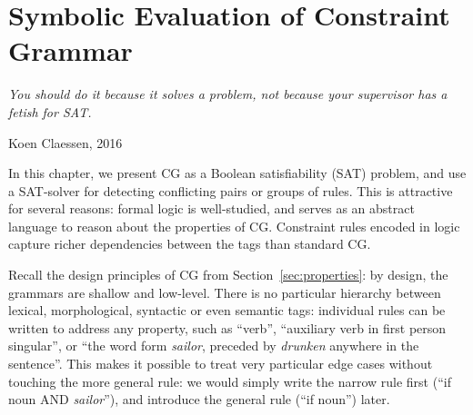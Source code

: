 \def\newcite#1{\cite{#1}}

\def\noun{\textsc{N}}
\def\verb{\textsc{V}}
\def\sg{\textsc{Sg}}
\def\pl{\textsc{Pl}}
\def\detdef{\textsc{DetDef}}

\def\la{\text{\em la}}
\def\casa{\text{\em casa}}
\def\grande{\text{\em grande}}
\def\wOne{\text{\em w1}}
\def\wTwo{\text{\em w2}}

\def\det{{\text{\sc Det}}}
\def\prn{{\text{\sc  Prn}}}
\def\n{{\text{\sc N}}}
\def\v{{\text{\sc V}}}
\def\adj{{\text{\sc Adj}}}

\def\laDet{\la_\det}
\def\laPrn{\la_\prn}
\def\casaN{\casa_\n}
\def\casaV{\casa_\v}
\def\grandeAdj{\grande_\adj}

\def\ob#1{\overbrace{ #1 \rule{0pt}{2ex}}}
\def\cgrule#1{{\ttfamily #1}}


\def\newVar{$\text{\em word}'_\textsc{ RD}$}
\def\oldVar{$\text{\em word}_\textsc{\,RD}$}
\def\eqdef{\Coloneqq}
\def\invConds{\text{invalid condition}}
\def\onlyTrgLeft{\text{only target left}}

\def\defRule{``do not remove the last reading''}


\chapter{Symbolic Evaluation of Constraint Grammar}
\label{chapterCGSAT}

\epigraph{\it You should do it because it solves a problem, not because your supervisor has a fetish for SAT.}{Koen Claessen, 2016}

\noindent In this chapter, we present CG as a Boolean satisfiability
(SAT) problem, and use a SAT-solver for detecting conflicting pairs or
groups of rules.
This is attractive for several reasons: formal logic is
well-studied, and serves as an abstract language to reason about the
properties of CG. Constraint rules encoded in logic capture richer
dependencies between the tags than standard CG. 

Recall the design principles of CG from Section~\ref{sec:properties}: 
by design, the grammars are shallow and low-level.
There is no particular hierarchy between lexical, morphological,
syntactic or even semantic tags: individual rules can be written to address any
property, such as ``verb'', ``auxiliary verb in first person singular'',
or ``the word form \emph{sailor}, preceded by \emph{drunken} anywhere in the
sentence''. This makes it possible to treat very particular edge
cases without touching the more general rule: we would simply write
the narrow rule first (``if noun AND \emph{sailor}''), and introduce
the general rule (``if noun'') later.

